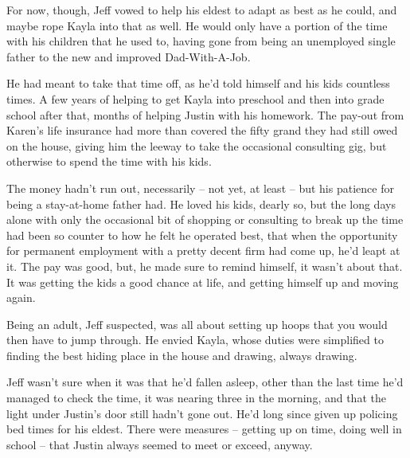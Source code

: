 For now, though, Jeff vowed to help his eldest to adapt as best as he could, and maybe rope Kayla into that as well.  He would only have a portion of the time with his children that he used to, having gone from being an unemployed single father to the new and improved Dad-With-A-Job.

He had meant to take that time off, as he'd told himself and his kids countless times.  A few years of helping to get Kayla into preschool and then into grade school after that, months of helping Justin with his homework.  The pay-out from Karen's life insurance had more than covered the fifty grand they had still owed on the house, giving him the leeway to take the occasional consulting gig, but otherwise to spend the time with his kids.

The money hadn't run out, necessarily -- not yet, at least -- but his patience for being a stay-at-home father had.  He loved his kids, dearly so, but the long days alone with only the occasional bit of shopping or consulting to break up the time had been so counter to how he felt he operated best, that when the opportunity for permanent employment with a pretty decent firm had come up, he'd leapt at it.  The pay was good, but, he made sure to remind himself, it wasn't about that.  It was getting the kids a good chance at life, and getting himself up and moving again.

Being an adult, Jeff suspected, was all about setting up hoops that you would then have to jump through.  He envied Kayla, whose duties were simplified to finding the best hiding place in the house and drawing, always drawing.

Jeff wasn't sure when it was that he'd fallen asleep, other than the last time he'd managed to check the time, it was nearing three in the morning, and that the light under Justin's door still hadn't gone out.  He'd long since given up policing bed times for his eldest.  There were measures -- getting up on time, doing well in school -- that Justin always seemed to meet or exceed, anyway.

\secdiv
